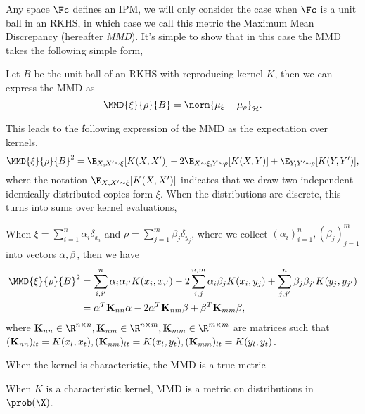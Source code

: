 Any space \(\Fc\) defines an IPM, we will only consider the case when \(\Fc\) is
a unit ball in an RKHS, in which case we call this metric the Maximum Mean
Discrepancy (hereafter \emph{MMD}). It's simple to show that in this case the
MMD takes the following simple form,
\begin{theorem}
\label{th:mmd-is-norm-between-feature-maps} Let \(B\) be the unit ball of an
RKHS with reproducing kernel \(K\), then we can express the MMD as
\begin{equation}
\label{eq:mmd-is-norm-between-feature-maps} \MMD{\xi}{\rho}{B} = \norm{\mu_{\xi}
- \mu_{\rho}}_{\rkhs{H}}.
\end{equation}
\end{theorem} This leads to the following expression of the MMD as the
expectation over kernels,
\begin{equation}
\label{eq:mmd-expectation-over-kernels} \MMD{\xi}{\rho}{B}^{2} = \E_{X, X' \sim
\xi}[K(X, X')] - 2 \E_{X \sim \xi, Y \sim \rho}[K(X, Y)] + \E_{Y, Y' \sim
\rho}[K(Y, Y')],
\end{equation} where the notation \(\E_{X, X' \sim \xi}[K(X, X')]\) indicates
that we draw two independent identically distributed copies form \(\xi\). When
the distributions are discrete, this turns into sums over kernel evaluations,
\begin{corollary}
\label{cor:discrete-dists-MMD-sum} When \(\xi = \sum_{i=1}^{n}\alpha_{i}
\delta_{x_{i}}\) and \(\rho = \sum_{j=1}^{m} \beta_{j} \delta_{y_{j}}\), where
we collect \((\alpha_{i})_{i=1}^{n}, (\beta_{j})_{j=1}^{m}\) into vectors
\(\mathbf{\alpha}, \mathbf{\beta}\), then we have
  \begin{align} \MMD{\xi}{\rho}{B}^{2} & = \sum_{i, i'}^{n} \alpha_i
\alpha_{i'}K(x_i, x_{i'}) - 2 \sum_{i, j}^{n, m} \alpha_i \beta_j K(x_i, y_j) +
\sum_{j, j'}^{n} \beta_j \beta_{j'}K(y_j, y_{j'}) \\ & = \mat{\alpha}^T
\mat{K}_{nn} \mat{\alpha} - 2 \mat{\alpha}^T \mat{K}_{nm} \mat{\beta} +
\mat{\beta}^T \mat{K}_{mm} \mat{\beta},
  \end{align} where \(\mat{K}_{nn} \in \R^{n \times n}, \mat{K}_{nm} \in \R^{n
\times m}, \mat{K}_{mm} \in \R^{m \times m}\) are matrices such that
\((\mathbf{K}_{nn})_{lt} = K(x_l, x_t), (\mathbf{K}_{nm})_{lt} = K(x_l, y_t),
(\mathbf{K}_{mm})_{lt} = K(y_l, y_t)\).
\end{corollary}

When the kernel is characteristic, the MMD is a true metric
\begin{theorem}
\label{th:when-characteristic-kernel-mmd-is-metric} When \(K\) is a
characteristic kernel, MMD is a metric on distributions in \(\prob(\X)\).
\end{theorem}

